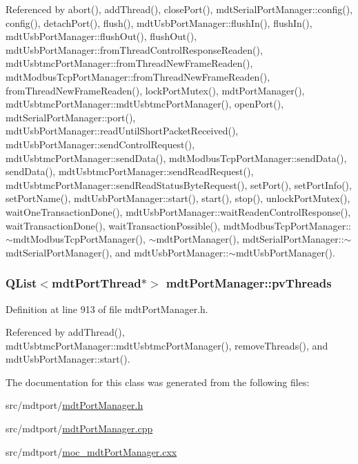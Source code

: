 Referenced by abort(), add\-Thread(), close\-Port(), mdt\-Serial\-Port\-Manager\-::config(), config(), detach\-Port(), flush(), mdt\-Usb\-Port\-Manager\-::flush\-In(), flush\-In(), mdt\-Usb\-Port\-Manager\-::flush\-Out(), flush\-Out(), mdt\-Usb\-Port\-Manager\-::from\-Thread\-Control\-Response\-Readen(), mdt\-Usbtmc\-Port\-Manager\-::from\-Thread\-New\-Frame\-Readen(), mdt\-Modbus\-Tcp\-Port\-Manager\-::from\-Thread\-New\-Frame\-Readen(), from\-Thread\-New\-Frame\-Readen(), lock\-Port\-Mutex(), mdt\-Port\-Manager(), mdt\-Usbtmc\-Port\-Manager\-::mdt\-Usbtmc\-Port\-Manager(), open\-Port(), mdt\-Serial\-Port\-Manager\-::port(), mdt\-Usb\-Port\-Manager\-::read\-Until\-Short\-Packet\-Received(), mdt\-Usb\-Port\-Manager\-::send\-Control\-Request(), mdt\-Usbtmc\-Port\-Manager\-::send\-Data(), mdt\-Modbus\-Tcp\-Port\-Manager\-::send\-Data(), send\-Data(), mdt\-Usbtmc\-Port\-Manager\-::send\-Read\-Request(), mdt\-Usbtmc\-Port\-Manager\-::send\-Read\-Status\-Byte\-Request(), set\-Port(), set\-Port\-Info(), set\-Port\-Name(), mdt\-Usb\-Port\-Manager\-::start(), start(), stop(), unlock\-Port\-Mutex(), wait\-One\-Transaction\-Done(), mdt\-Usb\-Port\-Manager\-::wait\-Readen\-Control\-Response(), wait\-Transaction\-Done(), wait\-Transaction\-Possible(), mdt\-Modbus\-Tcp\-Port\-Manager\-::$\sim$mdt\-Modbus\-Tcp\-Port\-Manager(), $\sim$mdt\-Port\-Manager(), mdt\-Serial\-Port\-Manager\-::$\sim$mdt\-Serial\-Port\-Manager(), and mdt\-Usb\-Port\-Manager\-::$\sim$mdt\-Usb\-Port\-Manager().

\hypertarget{classmdt_port_manager_a8e0d49b789f8b01d469e84b487799573}{
\subsubsection[{pv\-Threads}]{\setlength{\rightskip}{0pt plus 5cm}Q\-List$<${\bf mdt\-Port\-Thread}$\ast$$>$ mdt\-Port\-Manager\-::pv\-Threads\hspace{0.3cm}{\ttfamily [protected]}}}\label{classmdt_port_manager_a8e0d49b789f8b01d469e84b487799573}


Definition at line 913 of file mdt\-Port\-Manager.\-h.



Referenced by add\-Thread(), mdt\-Usbtmc\-Port\-Manager\-::mdt\-Usbtmc\-Port\-Manager(), remove\-Threads(), and mdt\-Usb\-Port\-Manager\-::start().



The documentation for this class was generated from the following files\-:\begin{DoxyCompactItemize}
\item 
src/mdtport/\hyperlink{mdt_port_manager_8h}{mdt\-Port\-Manager.\-h}\item 
src/mdtport/\hyperlink{mdt_port_manager_8cpp}{mdt\-Port\-Manager.\-cpp}\item 
src/mdtport/\hyperlink{moc__mdt_port_manager_8cxx}{moc\-\_\-mdt\-Port\-Manager.\-cxx}\end{DoxyCompactItemize}

